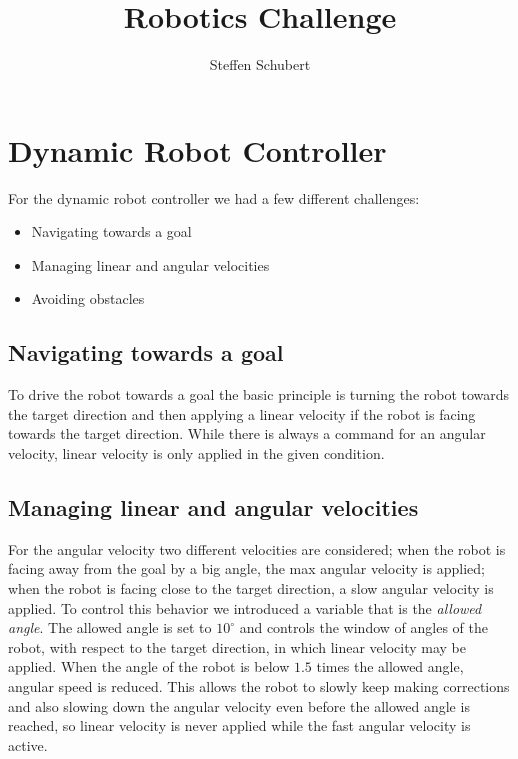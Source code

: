 \documentclass[
	fontsize=12pt,
	headings=small,
	parskip=half,           %
	bibliography=totoc,
	numbers=noenddot,       %
	open=any,               %
]{scrreprt}
\title{Robotics Challenge}
\author{Steffen Schubert}
\begin{document}


%
\tableofcontents

\newpage
{} %

\chapter{Dynamic Robot Controller}

For the dynamic robot controller we had a few different challenges:

\begin{itemize}
	\item Navigating towards a goal
	\item Managing linear and angular velocities
	\item Avoiding obstacles
\end{itemize}

\section{Navigating towards a goal}

To drive the robot towards a goal the basic principle is turning the robot towards the target direction and then applying a linear velocity if the robot is facing towards the target direction.
While there is always a command for an angular velocity, linear velocity is only applied in the given condition.

\section{Managing linear and angular velocities}
For the angular velocity two different velocities are considered; when the robot is facing away from the goal by a big angle, the max angular velocity is applied; when the robot is facing close to the target direction, a slow angular velocity is applied.
To control this behavior we introduced a variable that is the \emph{allowed angle}. The allowed angle is set to $10^\circ$ and controls the window of angles of the robot, with respect to the target direction, in which linear velocity may be applied.
When the angle of the robot is below $1.5$ times the allowed angle, angular speed is reduced.
This allows the robot to slowly keep making corrections and also slowing down the angular velocity even before the allowed angle is reached, so linear velocity is never applied while the fast angular velocity is active.
\end{document}
